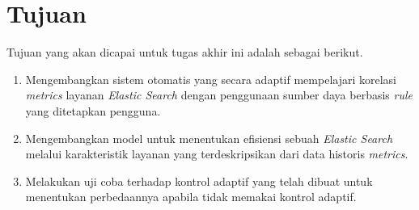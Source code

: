 \section{Tujuan}

Tujuan yang akan dicapai untuk tugas akhir ini adalah sebagai berikut.

\begin{enumerate}
    \item Mengembangkan sistem otomatis yang secara adaptif mempelajari korelasi \textit{metrics} layanan \textit{Elastic Search} dengan penggunaan sumber daya berbasis \textit{rule} yang ditetapkan pengguna.
    \item Mengembangkan model untuk menentukan efisiensi sebuah \textit{Elastic Search} melalui karakteristik layanan yang terdeskripsikan dari data historis \textit{metrics}.
    \item Melakukan uji coba terhadap kontrol adaptif yang telah dibuat untuk menentukan perbedaannya apabila tidak memakai kontrol adaptif.
\end{enumerate}